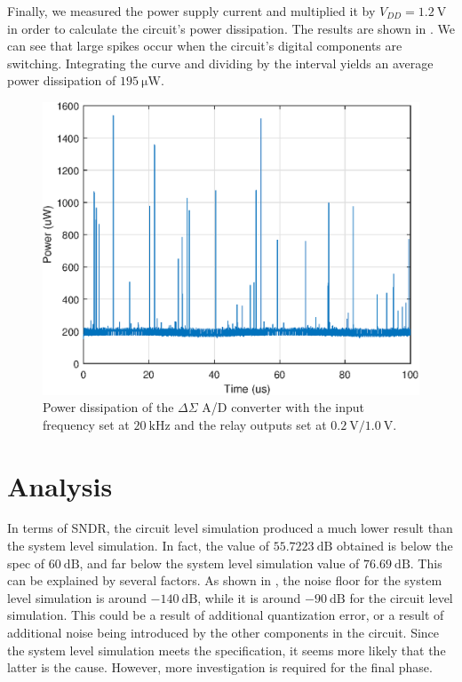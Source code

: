 \documentclass[journal,hidelinks]{IEEEtran}
\begin{document}
Finally, we measured the power supply current and multiplied it by $V_{DD} = \SI{1.2}{\volt}$ in order to calculate the circuit's power dissipation. The results are shown in . We can see that large spikes occur when the circuit's digital components are switching. Integrating the curve and dividing by the interval yields an average power dissipation of $\SI{195}{\micro\watt}$.

\begin{figure}[!htb]
  \centering
  \includegraphics[width=0.8\columnwidth]{circuit/adc_cir_power.eps}
  \caption{Power dissipation of the $\Delta \Sigma$ A/D converter with the input frequency set at $\SI{20}{\kilo\hertz}$ and the relay outputs set at $\SI{0.2}{\volt}/\SI{1.0}{\volt}$.}
  \label{fig:cir_power}
\end{figure}

\section{Analysis}

In terms of SNDR, the circuit level simulation produced a much lower result than the system level simulation. In fact, the value of $\SI{55.7223}{\deci\bel}$ obtained is below the spec of $\SI{60}{\deci\bel}$, and far below the system level simulation value of $\SI{76.69}{\deci\bel}$. This can be explained by several factors. As shown in , the noise floor for the system level simulation is around $\SI{-140}{\deci\bel}$, while it is around $\SI{-90}{\deci\bel}$ for the circuit level simulation. This could be a result of additional quantization error, or a result of additional noise being introduced by the other components in the circuit. Since the system level simulation meets the specification, it seems more likely that the latter is the cause. However, more investigation is required for the final phase.
\end{document}
